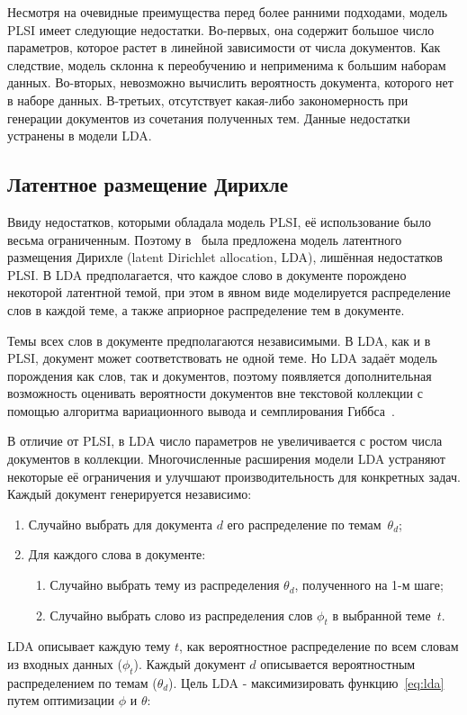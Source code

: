 Несмотря на очевидные преимущества перед более ранними подходами, модель PLSI имеет следующие недостатки. Во-первых, она содержит большое число параметров, которое растет в линейной зависимости от числа документов. Как следствие, модель склонна к переобучению и неприменима к большим наборам данных. Во-вторых, невозможно вычислить вероятность документа, которого нет в наборе данных. В-третьих, отсутствует какая-либо закономерность при генерации документов из сочетания полученных тем. Данные недостатки устранены в модели LDA.

\subsection{Латентное размещение Дирихле}
\label{ch1:lda}

Ввиду недостатков, которыми обладала модель PLSI, её использование было весьма ограниченным. Поэтому в~\cite{LDA} была предложена модель латентного размещения Дирихле (latent Dirichlet allocation, LDA), лишённая недостатков PLSI. В LDA предполагается, что каждое слово в документе порождено некоторой латентной темой, при этом в явном виде моделируется распределение слов в каждой теме, а также априорное распределение тем в документе. 

Темы всех слов в документе предполагаются независимыми. В LDA, как и в PLSI, документ может соответствовать не одной теме. Но LDA задаёт модель порождения как слов, так и документов, поэтому появляется дополнительная возможность оценивать вероятности документов вне текстовой коллекции с помощью алгоритма вариационного вывода и семплирования Гиббса~\cite{gibbs}. 

В отличие от PLSI, в LDA число параметров не увеличивается с ростом числа документов в коллекции. Многочисленные расширения модели LDA устраняют некоторые её ограничения и улучшают производительность для конкретных задач. 
Каждый документ генерируется независимо:

\begin{enumerate}
\item Случайно выбрать для документа $d$ его распределение по темам~$\theta_d$;
\item Для каждого слова в документе:
\begin{enumerate}
\item Случайно выбрать тему из распределения $\theta_d$, полученного на 1-м шаге;
\item Случайно выбрать слово из распределения слов  $\phi_t$ в выбранной теме~$t$.
\end{enumerate}
\end{enumerate}
LDA описывает каждую тему $t$, как вероятностное распределение по всем словам из входных данных ($\phi_t$). Каждый документ $d$ описывается вероятностным распределением по темам ($\theta_d$). Цель LDA - максимизировать функцию~\eqref{eq:lda} путем оптимизации $\phi$ и $\theta$:

